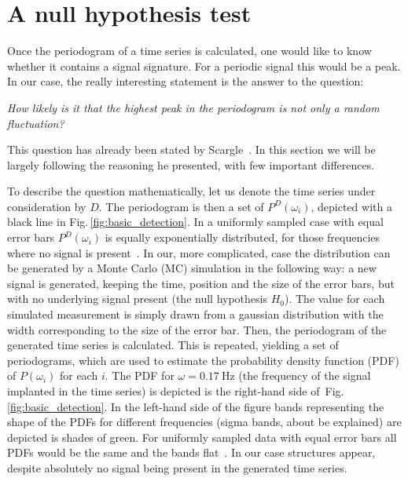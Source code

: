 \section{A null hypothesis test}
\label{sec:a_null_hypothesis_test}
Once the periodogram of a time series is calculated, one would like to know whether it contains a signal signature. For a periodic signal this would be a peak. In our case, the really interesting statement is the answer to the question:
\begin{center}
  \emph{How likely is it that the highest peak in the periodogram is not only a random fluctuation?}
\end{center}
This question has already been stated by Scargle~\cite{Scargle1982}. In this section we will be largely following the reasoning he presented, with few important differences.

To describe the question mathematically, let us denote the time series under consideration by $D$. The periodogram is then a set of $P^D(\omega_i)$, depicted with a black line in Fig.\,\ref{fig:basic_detection}. In a uniformly sampled case with equal error bars $P^D(\omega_i)$ is equally exponentially distributed, for those frequencies where no signal is present~\cite{Scargle1982}. In our, more complicated, case the distribution can be generated by a Monte Carlo (MC) simulation in the following way: a new signal is generated, keeping the time, position and the size of the error bars, but with no underlying signal present (the null hypothesis $H_0$). The value for each simulated measurement is simply drawn from a gaussian distribution with the width corresponding to the size of the error bar. Then, the periodogram of the generated time series is calculated. This is repeated, yielding a set of periodograms, which are used to estimate the probability density function (PDF) of $P(\omega_i)$ for each $i$. The PDF for $\omega = \SI{0.17}{\hertz}$ (the frequency of the signal implanted in the time series) is depicted is the right-hand side of~Fig.\,\ref{fig:basic_detection}.
In the left-hand side of the figure bands representing the shape of the PDFs for different frequencies (sigma bands, about be explained) are depicted is shades of green.
For uniformly sampled data with equal error bars all PDFs would be the same and the bands flat~\cite{Scargle1982}. In our case structures appear, despite absolutely no signal being present in the generated time series.

